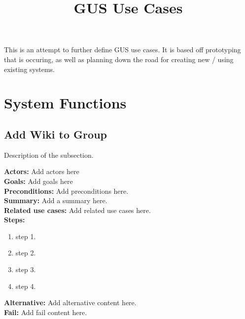 \documentclass[12pt]{article}
\title{GUS Use Cases}
\date{}
\begin{document}
  \maketitle
  This is an attempt to further define GUS use cases. It is based
  off prototyping that is occuring, as well as planning down the
  road for creating new / using existing systems.
 
\section{System Functions}
 
 \subsection{Add Wiki to Group}
 Description of the subsection.
 
 
 \textbf{Actors:} Add actors here \\

 
 \textbf{Goals:} Add goals here \\
 
 
 \textbf{Preconditions:} Add preconditions here. \\
 
 
 \textbf{Summary:} Add a summary here. \\
 
 
 \textbf{Related use cases:} Add related use cases here. \\
 
 
 \textbf{Steps:}
\begin{enumerate}
  \item step 1.
  \item step 2.
  \item step 3.
  \item step 4.
\end{enumerate}
   
   
 \textbf{Alternative:} Add alternative content here. \\
  
  
 \textbf{Fail:} Add fail content here. \\
\end{document}
